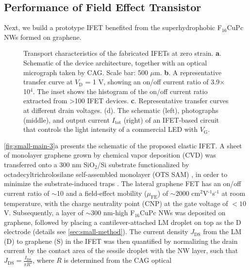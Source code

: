 \subsection{Performance of Field Effect Transistor }
\label{sec:small-field-effect-trans}

Next, we build a prototype IFET benefited from the superhydrophobic
F$_{16}$CuPc NWs formed on graphene.
%
\begin{figure}[!htbp]
  \centering
  \caption{\label{fig:small-main-3} Transport characteristics of the
    fabricated IFETs at zero strain. \textbf{a}. Schematic of the
    device architecture, together with an optical micrograph taken by
    CAG. Scale bar: 500 \(\mu\)m. \textbf{b}. A representative
    transfer curve at \(V_{\mathrm{D}}\) = 1 V, showing an on/off
    current ratio of 3.9\(\times{}\)10\(^{\text{4}}\). The inset shows
    the histogram of the on/off current ratio extracted from
    \textgreater{}100 IFET devices. \textbf{c}. Representative
    transfer curves at different drain voltages. (d). The schematic
    (left), photographs (middle), and output current
    \(I_{\mathrm{tot}}\) (right) of an IFET-based circuit that
    controls the light intensity of a commercial LED with
    \(V_{\mathrm{G}}\).}
\end{figure}
\autoref{fig:small-main-3}a presents the
schematic of the proposed elastic IFET.
%
A sheet of monolayer graphene grown by chemical vapor deposition (CVD)
was transferred onto a 300 nm SiO\(_{\text{2}}\)/Si substrate
functionalized by octadecyl\-trichrolosilane self-assembled monolayer
(OTS SAM) \autocite{Yan_2011}, in order to minimize the substrate-induced
traps \autocite{Wang_2011_quanti_doping_gr}.  The lateral graphene FET has
an on/off current ratio of \(\sim\)10 and a field-effect mobility
(\(\mu_{\mathrm{FE}}\)) of \(\sim\)2000
cm\(^{\text{2}}\)V\(^{\text{-1}}\)s\(^{\text{-1}}\) at room
temperature, with the charge neutrality point (CNP) at the gate
voltage of $<10$ V. Subsequently, a layer of \(\sim\)300 nm-high
F\(_{\text{16}}\)CuPc NWs was deposited on graphene, followed by
placing a cantilever-attached LM droplet on top as the D electrode
(details see \autoref{sec:small-method}).
%
The current density \(J_{\mathrm{DS}}\) from the LM (D) to graphene
(S) in the IFET was then quantified by normalizing the drain current
by the contact area of the sessile droplet with the NW layer, such
that
\(J_{\mathrm{DS}} = {\displaystyle \frac{I_{\mathrm{DS}}}{\pi
    R^{2}}}\), where \(R\) is determined from the CAG optical
